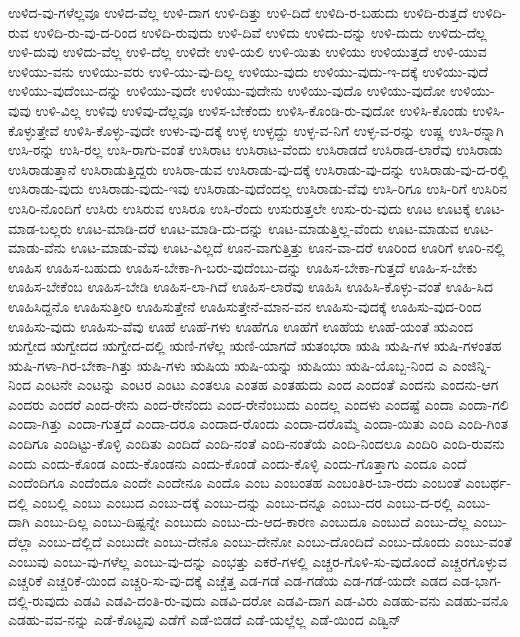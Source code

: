 {ಉಳಿದ-ವು-ಗಳೆಲ್ಲವೂ
ಉಳಿದ-ವೆಲ್ಲ
ಉಳಿ-ದಾಗ
ಉಳಿ-ದಿತ್ತು
ಉಳಿ-ದಿದೆ
ಉಳಿದಿ-ರ-ಬಹುದು
ಉಳಿದಿ-ರುತ್ತದೆ
ಉಳಿದಿ-ರುವ
ಉಳಿದಿ-ರು-ವು-ದ-ರಿಂದ
ಉಳಿದಿ-ರುವುದು
ಉಳಿ-ದಿವೆ
ಉಳಿದು
ಉಳಿದು-ದನ್ನು
ಉಳಿ-ದುದು
ಉಳಿದು-ದೆಲ್ಲ
ಉಳಿ-ದುವು
ಉಳಿದು-ವೆಲ್ಲ
ಉಳಿ-ದೆಲ್ಲ
ಉಳಿದೇ
ಉಳಿ-ಯಲಿ
ಉಳಿ-ಯಿತು
ಉಳಿಯು
ಉಳಿಯುತ್ತದೆ
ಉಳಿ-ಯುವ
ಉಳಿಯು-ವನು
ಉಳಿಯು-ವರು
ಉಳಿ-ಯು-ವು-ದಿಲ್ಲ
ಉಳಿಯು-ವುದು
ಉಳಿಯು-ವುದು-ಇ-ದಕ್ಕೆ
ಉಳಿಯು-ವುದೆ
ಉಳಿಯು-ವುದೆಂಬು-ದನ್ನು
ಉಳಿಯು-ವುದೇ
ಉಳಿಯು-ವುದೇನು
ಉಳಿಯು-ವುದೊ
ಉಳಿಯು-ವುದೋ
ಉಳಿಯು-ವುವು
ಉಳಿ-ವಿಲ್ಲ
ಉಳಿವು
ಉಳಿವು-ದೆಲ್ಲವೂ
ಉಳಿಸ-ಬೇಕೆಂದು
ಉಳಿಸಿ-ಕೊಂಡಿ-ರು-ವುದೋ
ಉಳಿಸಿ-ಕೊಂಡು
ಉಳಿಸಿ-ಕೊಳ್ಳುತ್ತೇವೆ
ಉಳಿಸಿ-ಕೊಳ್ಳು-ವುದೇ
ಉಳು-ವು-ದಕ್ಕೆ
ಉಳ್ಳ
ಉಳ್ಳದ್ದು
ಉಳ್ಳ-ವ-ನಿಗೆ
ಉಳ್ಳ-ವ-ರನ್ನು
ಉಷ್ಣ
ಉಸಿ-ರನ್ನಾಗಿ
ಉಸಿ-ರನ್ನು
ಉಸಿ-ರಲ್ಲ
ಉಸಿ-ರಾಗು-ವಂತೆ
ಉಸಿರಾಟ
ಉಸಿರಾಟ-ವೆಂದು
ಉಸಿರಾಡದೆ
ಉಸಿರಾಡ-ಲಾರೆವು
ಉಸಿರಾಡು
ಉಸಿರಾಡುತ್ತಾನೆ
ಉಸಿರಾಡುತ್ತಿದ್ದರು
ಉಸಿರಾ-ಡುವ
ಉಸಿರಾಡು-ವು-ದಕ್ಕೆ
ಉಸಿರಾಡು-ವು-ದನ್ನು
ಉಸಿರಾಡು-ವು-ದ-ರಲ್ಲಿ
ಉಸಿರಾಡು-ವುದು
ಉಸಿರಾಡು-ವುದು-ಇವು
ಉಸಿರಾಡು-ವುದೆಂದಲ್ಲ
ಉಸಿರಾಡು-ವೆವು
ಉಸಿ-ರಿಗೂ
ಉಸಿ-ರಿಗೆ
ಉಸಿರಿನ
ಉಸಿರಿ-ನೊಂದಿಗೆ
ಉಸಿರು
ಉಸಿರುವ
ಉಸಿರೂ
ಉಸಿ-ರೆಂದು
ಉಸುರುತ್ತಲೇ
ಉಸು-ರು-ವುದು
ಊಟ
ಊಟಕ್ಕೆ
ಊಟ-ಮಾಡ-ಬಲ್ಲರು
ಊಟ-ಮಾಡಿ-ದರೆ
ಊಟ-ಮಾಡಿ-ದು-ದನ್ನು
ಊಟ-ಮಾಡುತ್ತಿಲ್ಲ-ವೆಂದು
ಊಟ-ಮಾಡುವ
ಊಟ-ಮಾಡು-ವೆನು
ಊಟ-ಮಾಡು-ವೆವು
ಊಟ-ವಿಲ್ಲದೆ
ಊನ-ವಾಗುತ್ತಿತ್ತು
ಊನ-ವಾ-ದರೆ
ಊರಿಂದ
ಊರಿಗೆ
ಊರಿ-ನಲ್ಲಿ
ಊಹಿಸ
ಊಹಿಸ-ಬಹುದು
ಊಹಿಸ-ಬೇಕಾ-ಗಿ-ಬರು-ವುದೆಂಬು-ದನ್ನು
ಊಹಿಸ-ಬೇಕಾ-ಗುತ್ತದೆ
ಊಹಿ-ಸ-ಬೇಕು
ಊಹಿಸ-ಬೇಕೆಂಬ
ಊಹಿಸ-ಬೇಡಿ
ಊಹಿಸ-ಲಾ-ಗಿದೆ
ಊಹಿಸ-ಲಾರೆವು
ಊಹಿಸಿ
ಊಹಿಸಿ-ಕೊಳ್ಳು-ವಂತೆ
ಊಹಿ-ಸಿದ
ಊಹಿಸಿದ್ದನೊ
ಊಹಿಸುತ್ತೀರಿ
ಊಹಿಸುತ್ತೇನೆ
ಊಹಿಸುತ್ತೇನೆ-ಮಾನ-ವನ
ಊಹಿಸು-ವುದಕ್ಕೆ
ಊಹಿಸು-ವುದ-ರಿಂದ
ಊಹಿಸು-ವುದು
ಊಹಿಸು-ವೆವು
ಊಹೆ
ಊಹೆ-ಗಳು
ಊಹೆಗೂ
ಊಹೆಗೆ
ಊಹೆಯ
ಊಹೆ-ಯಂತೆ
ಋಎಂದ
ಋಗ್ವೇದ
ಋಗ್ವೇದದ
ಋಗ್ವೇದ-ದಲ್ಲಿ
ಋಣಿ-ಗಳೆಲ್ಲ
ಋಣಿ-ಯಾಗದೆ
ಋತಂಭರಾ
ಋಷಿ
ಋಷಿ-ಗಳ
ಋಷಿ-ಗಳಂತಹ
ಋಷಿ-ಗಳಾ-ಗಿರ-ಬೇಕಾ-ಗಿತ್ತು
ಋಷಿ-ಗಳು
ಋಷಿಯ
ಋಷಿ-ಯನ್ನು
ಋಷಿಯು
ಋಷಿ-ಯೊಬ್ಬ-ನಿಂದ
ಎ
ಎಂಜಿನ್ನಿ-ನಿಂದ
ಎಂಟನೇ
ಎಂಟನ್ನು
ಎಂಟರ
ಎಂಟು
ಎಂತಲೂ
ಎಂತಹ
ಎಂತಹುದು
ಎಂದ
ಎಂದಂತೆ
ಎಂದನು
ಎಂದನು-ಆಗ
ಎಂದರು
ಎಂದರೆ
ಎಂದ-ರೇನು
ಎಂದ-ರೇನೆಂದು
ಎಂದ-ರೇನೆಂಬುದು
ಎಂದಲ್ಲ
ಎಂದಳು
ಎಂದಷ್ಟೆ
ಎಂದಾ
ಎಂದಾ-ಗಲಿ
ಎಂದಾ-ಗಿತ್ತು
ಎಂದಾ-ಗುತ್ತದೆ
ಎಂದಾ-ದರೂ
ಎಂದಾದ-ರೊಂದು
ಎಂದಾ-ದರೊಮ್ಮೆ
ಎಂದಾ-ಯಿತು
ಎಂದಿ
ಎಂದಿ-ಗಿಂತ
ಎಂದಿಗೂ
ಎಂದಿಟ್ಟು-ಕೊಳ್ಳಿ
ಎಂದಿತು
ಎಂದಿದೆ
ಎಂದಿ-ನಂತೆ
ಎಂದಿ-ನಂತೆಯೆ
ಎಂದಿ-ನಿಂದಲೂ
ಎಂದಿರಿ
ಎಂದಿ-ರುವನು
ಎಂದು
ಎಂದು-ಕೊಂಡ
ಎಂದು-ಕೊಂಡನು
ಎಂದು-ಕೊಂಡೆ
ಎಂದು-ಕೊಳ್ಳಿ
ಎಂದು-ಗೊತ್ತಾಗು
ಎಂದೂ
ಎಂದೆ
ಎಂದೆಂದಿಗೂ
ಎಂದೆಂದೂ
ಎಂದೇ
ಎಂದೇನೂ
ಎಂದೊ
ಎಂಬ
ಎಂಬಂತಹ
ಎಂಬಂತಿರ-ಬಾ-ರದು
ಎಂಬಂತೆ
ಎಂಬರ್ಥ-ದಲ್ಲಿ
ಎಂಬಲ್ಲಿ
ಎಂಬು
ಎಂಬುದ
ಎಂಬು-ದಕ್ಕೆ
ಎಂಬು-ದನ್ನು
ಎಂಬು-ದನ್ನೂ
ಎಂಬು-ದರ
ಎಂಬು-ದ-ರಲ್ಲಿ
ಎಂಬು-ದಾಗಿ
ಎಂಬು-ದಿಲ್ಲ
ಎಂಬು-ದಿಷ್ಟನ್ನೇ
ಎಂಬುದು
ಎಂಬು-ದು-ಆದ-ಕಾರಣ
ಎಂಬುದೂ
ಎಂಬುದೆ
ಎಂಬು-ದೆಲ್ಲ
ಎಂಬು-ದೆಲ್ಲಾ
ಎಂಬು-ದೆಲ್ಲಿದೆ
ಎಂಬುದೇ
ಎಂಬು-ದೇನೊ
ಎಂಬು-ದೇನೋ
ಎಂಬು-ದೊಂದಿದೆ
ಎಂಬು-ದೊಂದು
ಎಂಬು-ವಂತೆ
ಎಂಬುವು
ಎಂಬು-ವು-ಗಳೆಲ್ಲ
ಎಂಬು-ವು-ದನ್ನು
ಎಂಭತ್ತು
ಎಕರೆ-ಗಳಲ್ಲಿ
ಎಚ್ಚರ-ಗೊಳಿ-ಸು-ವುದೊಂದೆ
ಎಚ್ಚರಗೊಳ್ಳುವ
ಎಚ್ಚರಿಕೆ
ಎಚ್ಚರಿಕೆ-ಯಿಂದ
ಎಚ್ಚರಿ-ಸು-ವು-ದಕ್ಕೆ
ಎಚ್ಚೆತ್ತ
ಎಡ-ಗಡೆ
ಎಡ-ಗಡೆಯ
ಎಡ-ಗಡೆ-ಯದೇ
ಎಡದ
ಎಡ-ಭಾಗ-ದಲ್ಲಿ-ರುವುದು
ಎಡವಿ
ಎಡವಿ-ದಂತಿ-ರು-ವುದು
ಎಡವಿ-ದರೋ
ಎಡವಿ-ದಾಗ
ಎಡ-ವಿರು
ಎಡಹು-ವನು
ಎಡಹು-ವನೊ
ಎಡಹು-ವವ-ನನ್ನು
ಎಡೆ-ಕೊಟ್ಟವು
ಎಡೆಗೆ
ಎಡೆ-ಬಿಡದೆ
ಎಡೆ-ಯಲ್ಲೆಲ್ಲ
ಎಡೆ-ಯಿಂದ
ಎಡ್ವಿನ್
}
